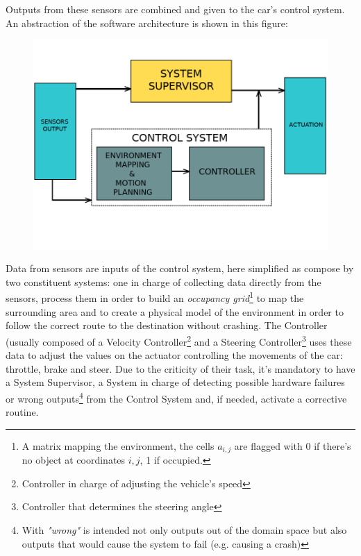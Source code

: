 Outputs from these sensors are combined and given to the car's control system.
An abstraction of the software architecture is shown in this figure:\newline\newline

\begin{figure}[h!]
	\includegraphics[width=\textwidth]{img/av-architecture.png}
\end{figure}

Data from sensors are inputs of the control system, here simplified as compose by two constituent systems: one in charge of collecting data directly from the sensors, process them in order to build an \textsl{occupancy grid}\footnote{A matrix mapping the environment, the cells $a_{i,j}$ are flagged with 0 if there's no object at coordinates $i,j$, 1 if occupied.} to map the surrounding area and to create a physical model of the environment in order to follow the correct route to the destination without crashing. The Controller (usually composed of a Velocity Controller\footnote{Controller in charge of adjusting the vehicle's speed} and a Steering Controller\footnote{Controller that determines the steering angle} uses these data to adjust the values on the actuator controlling the movements of the car: throttle, brake and steer.\newline
Due to the criticity of their task, it's mandatory to have a System Supervisor, a System in charge of detecting possible hardware failures or wrong outputs\footnote{With \textsl{"wrong"} is intended not only outputs out of the domain space but also outputs that would cause the system to fail (e.g. causing a crash)} from the Control System and, if needed, activate a corrective routine.

